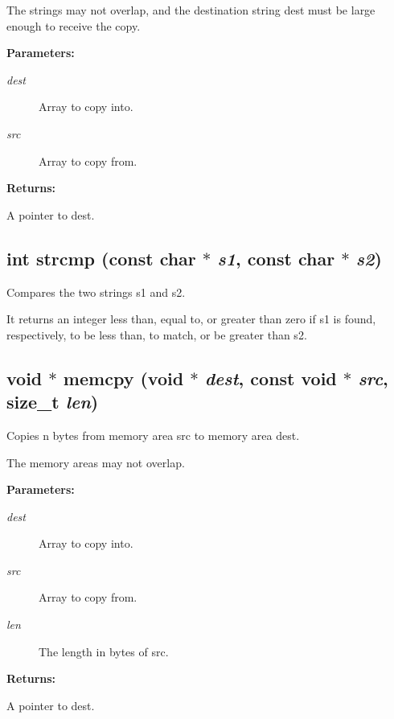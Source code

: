 The strings may not overlap, and the destination string dest must be large enough to receive the copy.

\begin{Desc}
\item[{\bf Parameters: }]\par
\begin{description}
\item[
{\em dest}] Array to copy into. \item[
{\em src}] Array to copy from. \end{description}
\end{Desc}
\begin{Desc}
\item[{\bf Returns: }]\par
A pointer to dest. \end{Desc}
\label{string.h_a1}
\subsection{\setlength{\rightskip}{0pt plus 5cm}int strcmp (const char $\ast$ {\em s1}, const char $\ast$ {\em s2})}

Compares the two strings s1 and s2.

It returns an integer less than, equal to, or greater than zero if s1 is found, respectively, to be less than, to match, or be greater than s2. \label{string.h_a2}
\subsection{\setlength{\rightskip}{0pt plus 5cm}void $\ast$ memcpy (void $\ast$ {\em dest}, const void $\ast$ {\em src}, size\_\-t {\em len})}

Copies n bytes from memory area src to memory area dest.

The memory areas may not overlap.

\begin{Desc}
\item[{\bf Parameters: }]\par
\begin{description}
\item[
{\em dest}] Array to copy into. \item[
{\em src}] Array to copy from. \item[
{\em len}] The length in bytes of src. \end{description}
\end{Desc}
\begin{Desc}
\item[{\bf Returns: }]\par
A pointer to dest. \end{Desc}
\label{string.h_a3}
